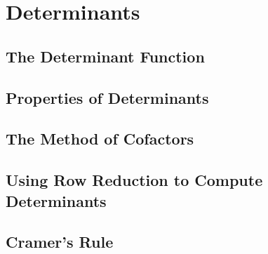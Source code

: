\documentclass[../satmath.tex]{subfiles}
\begin{document}
\chapter{Determinants}
\section{The Determinant Function}
\section{Properties of Determinants}
\section{The Method of Cofactors}
\section{Using Row Reduction to Compute Determinants}
\section{Cramer's Rule}
\end{document}
